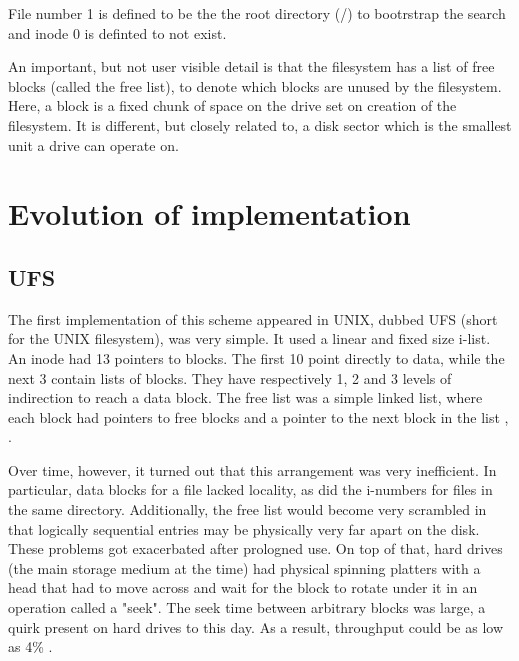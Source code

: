         File number 1 is defined to be the the root directory (/) to bootrstrap
        the search and inode 0 is definted to not exist.

        An important, but not user visible detail is that the filesystem has a
        list of free blocks (called the free list), to denote which blocks are
        unused by the filesystem. Here, a block is a fixed chunk of space on
        the drive set on creation of the filesystem. It is different, but
        closely related to, a disk sector which is the smallest unit a drive
        can operate on.

    \section{Evolution of implementation}

        \subsection{UFS}

            The first implementation of this scheme appeared in UNIX, dubbed
            UFS (short for the UNIX filesystem), was very simple.  It used a
            linear and fixed size i-list. An inode had 13 pointers to blocks.
            The first 10 point directly to data, while the next 3 contain lists
            of blocks. They have respectively 1, 2 and 3 levels of indirection
            to reach a data block. The free list was a simple linked list,
            where each block had pointers to free blocks and a pointer to the
            next block in the list \cite{UNIX_implementation},
            \cite{UNIX_source_commentary}.

            Over time, however, it turned out that this arrangement was very
            inefficient. In particular, data blocks for a file lacked locality,
            as did the i-numbers for files in the same directory. Additionally,
            the free list would become very scrambled in that logically
            sequential entries may be physically very far apart on the disk.
            These problems got exacerbated after prologned use. On top of that,
            hard drives (the main storage medium at the time) had physical
            spinning platters with a head that had to move across and wait for
            the block to rotate under it in an operation called a "seek". The
            seek time between arbitrary blocks was large, a quirk present on
            hard drives to this day. As a result, throughput could be as low as
            4\% \cite{FFS}.

